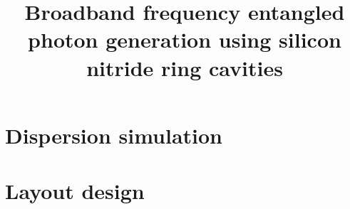 \documentclass[final]{kuee_en}
\title{Broadband frequency entangled photon generation using silicon nitride ring cavities}
\author{\cjk{殷　政浩}}
\date{\cjk{令和2年2月1日}}
\begin{document}
\maketitle

\begin{abstract}
    \lipsum[1]
\end{abstract}

\tableofcontents












\begin{acknowledgements}
\lipsum[2-4]
\end{acknowledgements}

% 
% 
% 
\printbibliography[title=References,heading=bibintoc]

\clearpage %
\processdelayedfloats
\clearpage

\begin{appendices}
\chapter{Dispersion simulation}
\chapter{Layout design}
\end{appendices}
\end{document}
